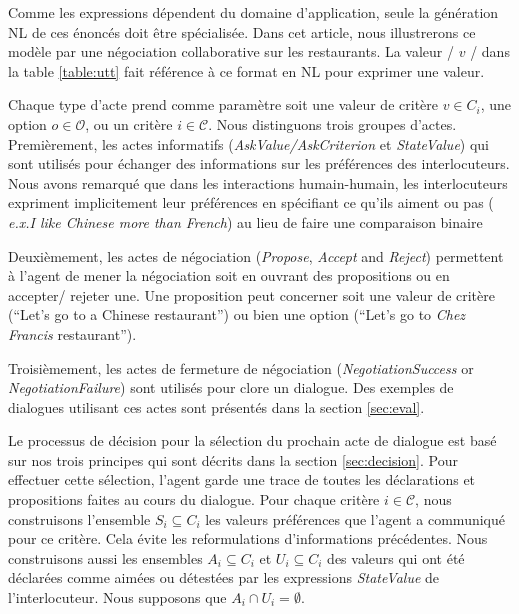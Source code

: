 \documentclass [french]{sig-alternate-05-2015}
\begin{document}
		Comme les expressions dépendent du domaine d'application, seule la génération NL de ces énoncés doit être spécialisée. Dans cet article, nous illustrerons ce modèle par une négociation collaborative sur les restaurants. La valeur / $ v $ / dans la table \ref {table:utt} fait référence à ce format  en NL pour exprimer une valeur.
		
		Chaque type d'acte prend comme paramètre soit une valeur de critère $v \in C_i$, une option $o \in \mathcal{O}$, ou un critère $i \in \mathcal{C}$. 
		Nous distinguons trois groupes d'actes. Premièrement, les actes informatifs (\textit{AskValue/AskCriterion} et \textit{StateValue}) qui sont utilisés pour échanger des informations sur les préférences des interlocuteurs.  Nous avons remarqué que dans les interactions humain-humain, les interlocuteurs expriment implicitement leur préférences en spécifiant ce qu'ils aiment ou pas ( \emph{e.x.}\textit{I like Chinese more than French}) au lieu de faire une comparaison binaire
		
		Deuxièmement, les actes de négociation (\textit{Propose}, \textit{Accept} and \textit{Reject}) permettent à l'agent de mener la négociation soit en ouvrant des propositions ou en accepter/ rejeter une. Une proposition peut concerner soit une valeur de critère (``Let's go to a Chinese restaurant'') ou bien une option (``Let's go to \emph{Chez Francis} restaurant'').
		
		Troisièmement, les actes de fermeture de négociation (\textit{NegotiationSuccess} or \textit{NegotiationFailure}) sont utilisés pour clore un dialogue. 
		Des exemples de dialogues utilisant ces actes sont présentés dans la section \ref{sec:eval}.
		
		Le processus de décision pour la sélection du prochain acte de dialogue est basé sur nos trois principes qui sont décrits dans la section \ref{sec:decision}. Pour effectuer cette sélection, l'agent garde une trace de toutes les déclarations et propositions faites au cours du dialogue. Pour chaque critère $ i \in \mathcal{C} $, nous construisons l'ensemble $ S_i \subseteq C_i $  les valeurs préférences que l'agent a communiqué pour ce critère. Cela évite les reformulations d'informations précédentes. Nous construisons aussi les ensembles $ A_i \subseteq C_i $ et $ U_i \subseteq C_i $ des valeurs qui ont été déclarées comme aimées ou détestées par les expressions \emph {StateValue} de l'interlocuteur. Nous supposons que $ A_i \cap U_i = \emptyset $.
		
\end{document}
